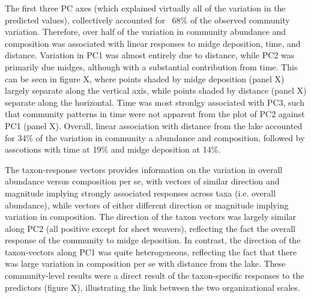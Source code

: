 The first three PC axes (which explained virtually all of the variation in the
predicted values), collectively accounted for ~68\% of the observed community variation.
Therefore, over half of the variation in community abundance and composition was
associated with linear responses to midge deposition, time, and distance.
Variation in PC1 was almost entirely due to distance, while PC2 was primarily due midges,
although with a substantial contribution from time.
This can be seen in figure X, where points shaded by midge deposition (panel X)
largely separate along the vertical axis, while points shaded by distance (panel X)
separate along the horizontal.
Time was most stronlgy associated with PC3, such that community patterns in time were
not apparent from the plot of PC2 against PC1 (panel X).
Overall, linear association with distance from the lake accounted for
34\% of the variation in community a abundance and composition,
followed by asscotions with time at 19\% and midge deposition at 14\%.

The taxon-response vectors provides information on the variation in overall
abundance versus composition per se, with vectors of similar direction and magnitude
implying strongly associated responses across taxa (i.e. overall abundance),
while vectors of either different direction or magnitude implying
variation in composition.
The direction of the taxon vectors was largely similar along PC2 (all positive
except for sheet weavers), reflecting the fact the overall
response of the community to midge deposition.
In contrast, the direction of the taxon-vectors along PC1 was quite heterogeneous,
reflecting the fact that there was large variation in composition per se with
distance from the lake.
These community-level results were a direct result of the taxon-specific responses
to the predictors (figure X),
illustrating the link between the two organizational scales.
